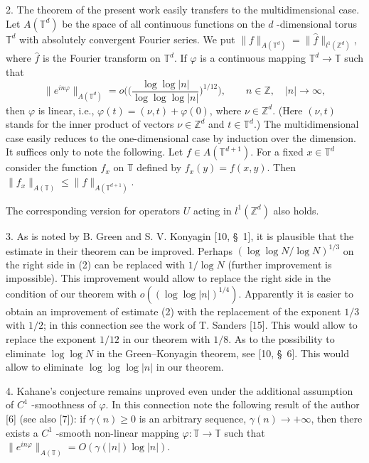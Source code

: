 \documentclass[12pt]{article}
\begin{document}
  2. The theorem of the present work easily transfers to
the multidimensional case. Let $A(\mathbb T^d)$ be the space of
all continuous functions on the $d$ -dimensional torus $\mathbb
T^d$ with absolutely convergent Fourier series. We put
$\|f\|_{A(\mathbb T^d)}=\|\widehat{f}\|_{l^1(\mathbb Z^d)}$, where
$\widehat{f}$ is the Fourier transform on $\mathbb T^d$. If
$\varphi$ is a continuous mapping $\mathbb T^d\rightarrow\mathbb
T$ such that
$$
\|e^{in\varphi}\|_{A(\mathbb T^d)}=
o\bigg(\bigg(\frac{\log\log |n|}{\log\log\log |n|}\bigg)^{1/12}\bigg),
\qquad n\in\mathbb Z, \quad |n|\rightarrow \infty,
$$
then $\varphi$ is linear, i.e., $\varphi(t)=(\nu,t)+\varphi(0)$,
where $\nu\in\mathbb Z^d$. (Here $(\nu, t)$ stands for the inner
product of vectors $\nu\in\mathbb Z^d$ and $t\in\mathbb T^d$.) The
multidimensional case easily reduces to the one-dimensional case
by induction over the dimension. It suffices only to note the
following. Let $f\in A(\mathbb T^{d+1})$. For a fixed $x\in\mathbb
T^d$ consider the function $f_x$ on $\mathbb T$ defined by
$f_x(y)=f(x, y)$. Then $\|f_x\|_{A(\mathbb T)}\leq\|f\|_{A(\mathbb
T^{d+1})}$.

   The corresponding version for operators $U$ acting in
$l^1(\mathbb Z^d)$ also holds.

  3. As is noted by B. Green and S. V. Konyagin
[10, \S~1], it is plausible that the estimate in their theorem can
be improved. Perhaps $(\log\log N/\log N)^{1/3}$ on the right side
in (2) can be replaced with $1/\log N$ (further improvement is
impossible). This improvement would allow to replace the right
side in the condition of our theorem with $o((\log\log
|n|)^{1/4})$. Apparently it is easier to obtain an improvement of
estimate (2) with the replacement of the exponent $1/3$ with
$1/2$; in this connection see the work of T. Sanders [15]. This
would allow to replace the exponent $1/12$ in our theorem with
$1/8$. As to the possibility to eliminate $\log\log N$ in the
Green--Konyagin theorem, see [10, \S~6]. This would allow to
eliminate $\log\log\log |n|$ in our theorem.

  4. Kahane's conjecture remains unproved even under the additional
assumption of $C^1$ -smoothness of $\varphi$. In this connection
note the following result of the author [6] (see also [7]): if
$\gamma(n)\geq 0$ is an arbitrary sequence,
$\gamma(n)\rightarrow+\infty$, then there exists a $C^1$ -smooth
non-linear mapping $\varphi : \mathbb T\rightarrow\mathbb T$ such
that $\|e^{in\varphi}\|_{A(\mathbb T)}=O(\gamma(|n|)\log |n|)$.
\end{document}
